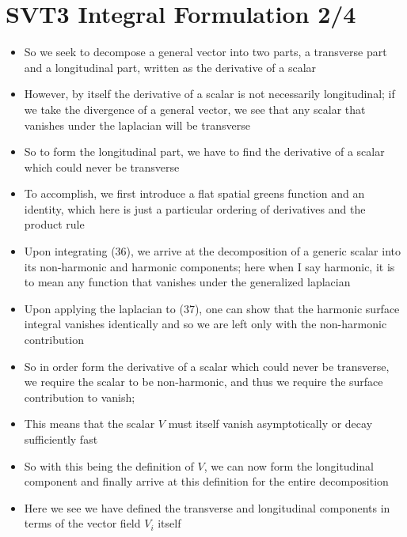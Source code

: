 \documentclass[10pt,letterpaper]{article}
\numberwithin{equation}{section}
\begin{document}
\section{SVT3 Integral Formulation 2/4}
\begin{itemize}
	\item So we seek to decompose a general vector into two parts, a transverse part and a longitudinal part, written as the derivative of a scalar
	\item However, by itself the derivative of a scalar is not necessarily longitudinal; if we take the divergence of a general vector, we see that any scalar that vanishes under the laplacian will be transverse
	\item So to form the longitudinal part, we have to find the derivative of a scalar which could never be transverse
	\item To accomplish, we first introduce a flat spatial greens function and an identity, which here is just a particular ordering of derivatives and the product rule
	\item Upon integrating (36), we arrive at the decomposition of a generic scalar into its non-harmonic and harmonic components; here when I say harmonic, it is to mean any function that vanishes under the generalized laplacian
	\item Upon applying the laplacian to (37), one can show that the harmonic surface integral vanishes identically and so we are left only with the non-harmonic contribution
	\item So in order form the derivative of a scalar which could never be transverse, we require the scalar to be non-harmonic, and thus we require the surface contribution to vanish; 
	\item This means that the scalar $V$ must itself vanish asymptotically or decay sufficiently fast
	\item So with this being the definition of $V$, we can now form the longitudinal component and finally arrive at this definition for the entire decomposition
	\item Here we see we have defined the transverse and longitudinal components in terms of the vector field $V_i$ itself
\end{itemize}

\end{document}
